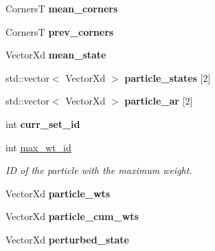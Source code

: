 \begin{DoxyCompactItemize}
\item 
\hypertarget{classPF_afb3cf74b6265a1a7e64efb41b53614e9}{Corners\-T {\bfseries mean\-\_\-corners}}\label{classPF_afb3cf74b6265a1a7e64efb41b53614e9}

\item 
\hypertarget{classPF_ab20cbc3cb91928b83efa73e649870975}{Corners\-T {\bfseries prev\-\_\-corners}}\label{classPF_ab20cbc3cb91928b83efa73e649870975}

\item 
\hypertarget{classPF_a77a982a0333039038a8fffb9608ec886}{Vector\-Xd {\bfseries mean\-\_\-state}}\label{classPF_a77a982a0333039038a8fffb9608ec886}

\item 
\hypertarget{classPF_aef37a2dd71f2aa86320f4a30eac4a3c2}{std\-::vector$<$ Vector\-Xd $>$ {\bfseries particle\-\_\-states} \mbox{[}2\mbox{]}}\label{classPF_aef37a2dd71f2aa86320f4a30eac4a3c2}

\item 
\hypertarget{classPF_a81d995cc0ec3666ccc0d196299e67b82}{std\-::vector$<$ Vector\-Xd $>$ {\bfseries particle\-\_\-ar} \mbox{[}2\mbox{]}}\label{classPF_a81d995cc0ec3666ccc0d196299e67b82}

\item 
\hypertarget{classPF_a67f97fe79ceb398db681cdc101cdcfe4}{int {\bfseries curr\-\_\-set\-\_\-id}}\label{classPF_a67f97fe79ceb398db681cdc101cdcfe4}

\item 
\hypertarget{classPF_a6ccad6776f706d957ab7b2f878d18d33}{int \hyperlink{classPF_a6ccad6776f706d957ab7b2f878d18d33}{max\-\_\-wt\-\_\-id}}\label{classPF_a6ccad6776f706d957ab7b2f878d18d33}

\begin{DoxyCompactList}\small\item\em I\-D of the particle with the maximum weight. \end{DoxyCompactList}\item 
\hypertarget{classPF_af90dde7a15bd4d5c72bb02d3e339c14e}{Vector\-Xd {\bfseries particle\-\_\-wts}}\label{classPF_af90dde7a15bd4d5c72bb02d3e339c14e}

\item 
\hypertarget{classPF_a771fae00477c6011293b8669ce6f8c46}{Vector\-Xd {\bfseries particle\-\_\-cum\-\_\-wts}}\label{classPF_a771fae00477c6011293b8669ce6f8c46}

\item 
\hypertarget{classPF_a30a497ba62d88abcbfdfa1b11a361929}{Vector\-Xd {\bfseries perturbed\-\_\-state}}\label{classPF_a30a497ba62d88abcbfdfa1b11a361929}


\end{DoxyCompactItemize}
